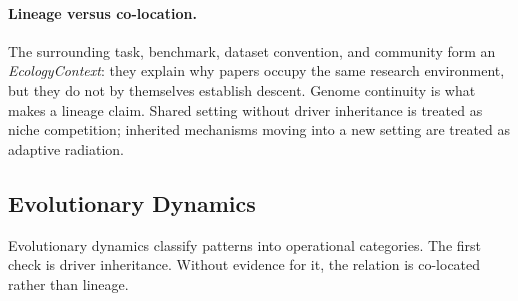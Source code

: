 \paragraph{Lineage versus co-location.}
The surrounding task, benchmark, dataset convention, and community form an \emph{EcologyContext}: they explain why papers occupy the same research environment, but they do not by themselves establish descent. Genome continuity is what makes a lineage claim. Shared setting without driver inheritance is treated as niche competition; inherited mechanisms moving into a new setting are treated as adaptive radiation.

\subsection{Evolutionary Dynamics}
\label{sec:dynamics}

Evolutionary dynamics classify \genomediff{} patterns into operational categories. The first check is driver inheritance. Without evidence for it, the relation is co-located rather than lineage.

